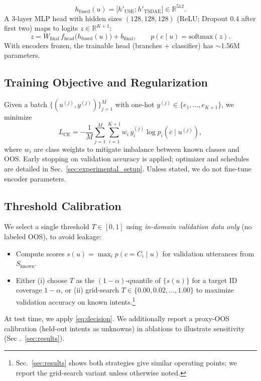 \documentclass[journal,letterpaper]{IEEEtran}
\begin{document}
\begin{equation}
\label{eq:fuse}
h_{\text{fused}}(u)=\big[h'_{\text{USE}};h'_{\text{TSDAE}}\big]\in\mathbb{R}^{512}.
\end{equation}
A 3-layer MLP head with hidden sizes $(128,128,128)$ (ReLU; Dropout $0.4$ after first two) maps to logits $z\in\mathbb{R}^{K+1}$:
\begin{equation}
\label{eq:softmax}
z=W_{\text{final}}\,f_{\text{head}}\!\big(h_{\text{fused}}(u)\big)+b_{\text{final}},\qquad
p(c\mid u)=\mathrm{softmax}(z).
\end{equation}
With encoders frozen, the trainable head (branches $+$ classifier) has $\sim$1.56M parameters.

\subsection{Training Objective and Regularization}
Given a batch $\{(u^{(j)},y^{(j)})\}_{j=1}^M$ with one-hot $y^{(j)}\in\{e_1,\ldots,e_{K+1}\}$, we minimize
\begin{equation}
\label{eq:ce}
L_{\text{CE}}=-\frac{1}{M}\sum_{j=1}^{M}\sum_{i=1}^{K+1} w_i\, y_i^{(j)}\log p_i(c\mid u^{(j)}),
\end{equation}
where $w_i$ are class weights to mitigate imbalance between known classes and OOS. Early stopping on validation accuracy is applied; optimizer and schedules are detailed in Sec.~\ref {sec:experimental_setup}. Unless stated, we do not fine-tune encoder parameters.

\subsection{Threshold Calibration}
We select a single threshold $T\in[0,1]$ using \emph{in-domain validation data only} (no labeled OOS), to avoid leakage:
\begin{itemize}
\item Compute scores $s(u)=\max_i p(c{=}C_i\mid u)$ for validation utterances from $S_{\text{known}}$.
\item Either (i) choose $T$ as the $(1{-}\alpha)$-quantile of $\{s(u)\}$ for a target ID coverage $1{-}\alpha$, or (ii) grid-search $T\in\{0.00,0.02,\ldots,1.00\}$ to maximize validation accuracy on known intents.\footnote{Sec.~\ref{sec:results} shows both strategies give similar operating points; we report the grid-search variant unless otherwise noted.}
\end{itemize}
At test time, we apply \eqref{eq:decision}. We additionally report a proxy-OOS calibration (held-out intents as unknowns) in ablations to illustrate sensitivity (Sec .~\ref{sec:results}).
\end{document}
